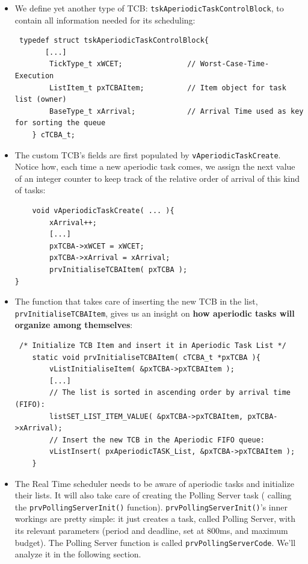 \documentclass[10pt]{article}
\begin{document}
\begin{itemize}
\begin{lstlisting}
\end{lstlisting}
\item We define yet another type of TCB: \verb|tskAperiodicTaskControlBlock|, to contain all information needed for its scheduling:
\begin{lstlisting}
 typedef struct tskAperiodicTaskControlBlock{
       [...]
        TickType_t xWCET;               // Worst-Case-Time-Execution
        ListItem_t pxTCBAItem;          // Item object for task list (owner)
        BaseType_t xArrival;            // Arrival Time used as key for sorting the queue
    } cTCBA_t;
\end{lstlisting} 
\item The custom TCB's fields are first populated by \verb|vAperiodicTaskCreate|. Notice how, each time a new aperiodic task comes, we assign the next value of an integer counter to keep track of the relative order of arrival of this kind of tasks:
\begin{lstlisting}
    void vAperiodicTaskCreate( ... ){
        xArrival++;
        [...]
        pxTCBA->xWCET = xWCET;
        pxTCBA->xArrival = xArrival;
        prvInitialiseTCBAItem( pxTCBA );
}
\end{lstlisting}
\item The function that takes care of inserting the new TCB in the list, \verb|prvInitialiseTCBAItem|, gives us an insight on \textbf{how aperiodic tasks will organize among themselves}:
\begin{lstlisting}
 /* Initialize TCB Item and insert it in Aperiodic Task List */
    static void prvInitialiseTCBAItem( cTCBA_t *pxTCBA ){
        vListInitialiseItem( &pxTCBA->pxTCBAItem );
        [...]
        // The list is sorted in ascending order by arrival time (FIFO):
        listSET_LIST_ITEM_VALUE( &pxTCBA->pxTCBAItem, pxTCBA->xArrival);
        // Insert the new TCB in the Aperiodic FIFO queue:
        vListInsert( pxAperiodicTASK_List, &pxTCBA->pxTCBAItem );
    }
\end{lstlisting}
\item The Real Time scheduler needs to be aware of aperiodic tasks and initialize their lists. It will also take care of creating the Polling Server task ( calling the \verb|prvPollingServerInit()| function).
\verb|prvPollingServerInit()|'s inner workings are pretty simple: it just creates a task, called Polling Server, with its relevant parameters (period and deadline, set at 800ms, and maximum budget).
The Polling Server function is called \verb|prvPollingServerCode|. We'll analyze it in the following section.

\end{itemize}
\end{document}

